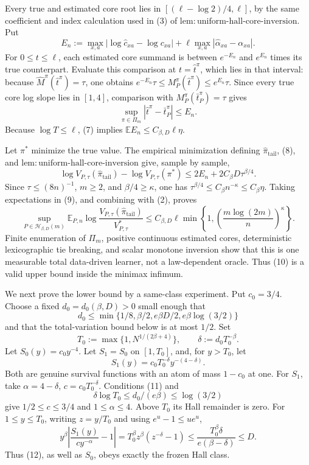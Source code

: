 Every true and estimated core root lies in \([ (\ell-\log2)/4,\ell]\), by the same coefficient and index calculation used in (3) of \(\mathrm{lem{:}uniform\text{-}hall\text{-}core\text{-}inversion}\).  Put
\[
E_n:=\max_{x,a}|\log\widehat c_{xa}-\log c_{xa}|
+\ell\max_{x,a}|\widehat\alpha_{xa}-\alpha_{xa}|.
\]
For \(0\leq t\leq\ell\), each estimated core summand is between \(e^{-E_n}\) and \(e^{E_n}\) times its true counterpart.  Evaluate this comparison at \(t=\widehat t^\pi\), which lies in that interval: because \(\widehat M^\pi(\widehat t^\pi)=\tau\), one obtains \(e^{-E_n}\tau\leq M_P^\pi(\widehat t^\pi)\leq e^{E_n}\tau\).  Since every true core log slope lies in \([1,4]\), comparison with \(M_P^\pi(\bar t_P^\pi)=\tau\) gives
\[
\sup_{\pi\in\Pi_m}|\widehat t^\pi-\bar t_P^\pi|\leq E_n.              \tag{8}
\]
Because \(\log T\leq\ell\), (7) implies \(\mathbb E E_n\leq C_{\beta,D}\ell\eta\).

Let \(\pi^*\) minimize the true value.  The empirical minimization defining \(\widehat\pi_{\mathrm{tail}}\), (8), and \(\mathrm{lem{:}uniform\text{-}hall\text{-}core\text{-}inversion}\) give, sample by sample,
\[
\log V_{P,\tau}(\widehat\pi_{\mathrm{tail}})-\log V_{P,\tau}(\pi^*)
\leq2E_n+2C_\beta D\tau^{\beta/4}.                                      \tag{9}
\]
Since \(\tau\leq(8n)^{-1}\), \(m\geq2\), and \(\beta/4\geq\kappa\), one has \(\tau^{\beta/4}\leq C_\beta n^{-\kappa}\leq C_\beta\eta\).  Taking expectations in (9), and combining with (2), proves
\[
\sup_{P\in\mathcal H_{\beta,D}(m)}
\mathbb E_{P,n}\log\frac{V_{P,\tau}(\widehat\pi_{\mathrm{tail}})}{V^*_{P,\tau}}
\leq C_{\beta,D}\ell\min\left\{1,\left(\frac{m\log(2m)}n\right)^\kappa\right\}. \tag{10}
\]
Finite enumeration of \(\Pi_m\), positive continuous estimated cores, deterministic lexicographic tie breaking, and scalar monotone inversion show that this is one measurable total data-driven learner, not a law-dependent oracle.  Thus (10) is a valid upper bound inside the minimax infimum.

We next prove the lower bound by a same-class experiment.  Put \(c_0=3/4\).  Choose a fixed \(d_0=d_0(\beta,D)>0\) small enough that
\[
d_0\leq\min\{1/8,\beta/2,e\beta D/2,e\beta\log(3/2)\}                  \tag{11}
\]
and that the total-variation bound below is at most \(1/2\).  Set
\[
T_0:=\max\{1,N^{1/(2\beta+4)}\},\qquad
\delta:=d_0T_0^{-\beta}.
\]
Let \(S_0(y)=c_0y^{-4}\).  Let \(S_1=S_0\) on \([1,T_0]\), and, for \(y>T_0\), let
\[
S_1(y)=c_0T_0^{-\delta}y^{-(4-\delta)}.                                  \tag{12}
\]
Both are genuine survival functions with an atom of mass \(1-c_0\) at one.  For \(S_1\), take \(\alpha=4-\delta\), \(c=c_0T_0^{-\delta}\).  Conditions (11) and
\[
\delta\log T_0\leq d_0/(e\beta)\leq\log(3/2)
\]
give \(1/2\leq c\leq3/4\) and \(1\leq\alpha\leq4\).  Above \(T_0\) its Hall remainder is zero.  For \(1\leq y\leq T_0\), writing \(z=y/T_0\) and using \(e^u-1\leq ue^u\),
\[
y^\beta\left|\frac{S_1(y)}{cy^{-\alpha}}-1\right|
=T_0^\beta z^\beta(z^{-\delta}-1)
\leq\frac{T_0^\beta\delta}{e(\beta-\delta)}
\leq D.                                                                 \tag{13}
\]
Thus (12), as well as \(S_0\), obeys exactly the frozen Hall class.

